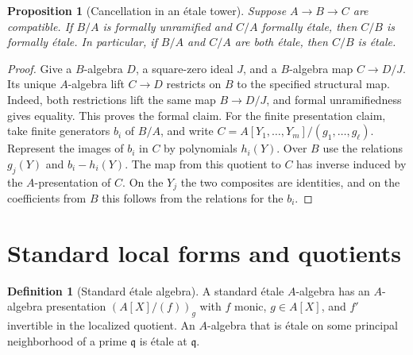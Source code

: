 \documentclass[11pt,oneside,openany]{book}
\newtheorem{proposition}[theorem]{Proposition}
\theoremstyle{definition}
\newtheorem{definition}[theorem]{Definition}
\theoremstyle{remark}
\begin{document}
\begin{proposition}[Cancellation in an \'{e}tale tower]\label{res:ET-05}
Suppose $A\to B\to C$ are compatible. If $B/A$ is formally
unramified and $C/A$ formally \'{e}tale, then $C/B$ is formally
\'etale. In particular, if $B/A$ and $C/A$ are both \'{e}tale, then
$C/B$ is \'{e}tale.
\end{proposition}
\begin{proof}
Give a $B$-algebra $D$, a square-zero ideal $J$, and a $B$-algebra map
$C\to D/J$. Its unique $A$-algebra lift $C\to D$ restricts on $B$ to
the specified structural map. Indeed, both restrictions lift the
same map $B\to D/J$, and formal unramifiedness gives equality.
This proves the formal claim. For the finite presentation claim, take
finite generators $b_i$ of $B/A$, and write
$C=A[Y_1,\ldots,Y_m]/(g_1,\ldots,g_\ell)$.
Represent the images of $b_i$ in $C$ by polynomials $h_i(Y)$.
Over $B$ use the relations $g_j(Y)$ and $b_i-h_i(Y)$. The map from
this quotient to $C$ has inverse induced by the $A$-presentation of
$C$. On the $Y_j$ the two composites are identities, and on the
coefficients from $B$ this follows from the relations for the $b_i$.
\end{proof}

\section{Standard local forms and quotients}

\begin{definition}[Standard \'etale algebra]\label{res:ET-06}
A standard \'{e}tale $A$-algebra has an $A$-algebra presentation
$(A[X]/(f))_g$ with $f$ monic, $g\in A[X]$, and $f'$ invertible in
the localized quotient. An $A$-algebra that is \'{e}tale on some
principal neighborhood of a prime $\mathfrak q$ is \'{e}tale at
$\mathfrak q$.
\end{definition}
\end{document}

